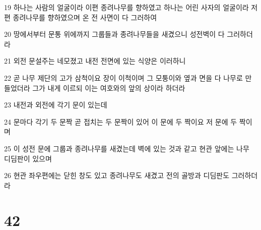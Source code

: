 \par 19 하나는 사람의 얼굴이라 이편 종려나무를 향하였고 하나는 어린 사자의 얼굴이라 저편 종려나무를 향하였으며 온 전 사면이 다 그러하여
\par 20 땅에서부터 문통 위에까지 그룹들과 종려나무들을 새겼으니 성전벽이 다 그러하더라
\par 21 외전 문설주는 네모졌고 내전 전면에 있는 식양은 이러하니
\par 22 곧 나무 제단의 고가 삼척이요 장이 이척이며 그 모퉁이와 옆과 면을 다 나무로 만들었더라 그가 내게 이르되 이는 여호와의 앞의 상이라 하더라
\par 23 내전과 외전에 각기 문이 있는데
\par 24 문마다 각기 두 문짝 곧 접치는 두 문짝이 있어 이 문에 두 짝이요 저 문에 두 짝이며
\par 25 이 성전 문에 그룹과 종려나무를 새겼는데 벽에 있는 것과 같고 현관 앞에는 나무 디딤판이 있으며
\par 26 현관 좌우편에는 닫힌 창도 있고 종려나무도 새겼고 전의 골방과 디딤판도 그러하더라

\chapter{42}

